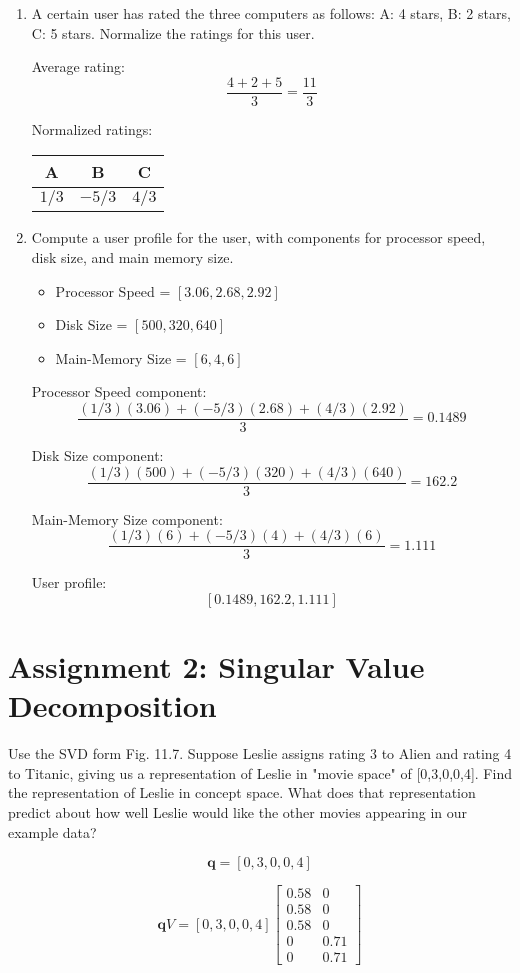 \documentclass{article}
\begin{document}
\begin{enumerate}
\item{A certain user has rated the three computers as follows: A: 4 stars, B: 2 stars, C: 5 stars. Normalize the ratings for this user.

Average rating: $$\frac{4+2+5}{3} = \frac{11}{3}$$

Normalized ratings:
	\begin{center}
	\begin{tabular}{ c | c | c }
		A    & B     & C    \\ \hline
		$1/3$ & $-5/3$ & $4/3$
	\end{tabular}
\end{center}
}
\item{Compute a user profile for the user, with components for processor speed, disk size, and main memory size.
	
	\begin{itemize}
		\item Processor Speed = $[3.06, 2.68, 2.92]$
		\item Disk Size = $[500, 320, 640]$
		\item Main-Memory Size = $[6, 4, 6]$
	\end{itemize}

	Processor Speed component:
	$$\frac{(1/3)(3.06)+(-5/3)(2.68)+(4/3)(2.92)}{3} = 0.1489$$

	Disk Size component:
	$$\frac{(1/3)(500)+(-5/3)(320)+(4/3)(640)}{3} = 162.2$$
	
	Main-Memory Size component:
	$$\frac{(1/3)(6)+(-5/3)(4)+(4/3)(6)}{3} = 1.111$$

	User profile:
	$$[0.1489, 162.2, 1.111]$$

}
\end{enumerate}

\section{Assignment 2: Singular Value Decomposition}
Use the SVD form Fig. 11.7. Suppose Leslie assigns rating 3 to Alien and rating 4 to Titanic, giving us a representation of Leslie in "movie space" of [0,3,0,0,4]. Find the representation of Leslie in concept space. What does that representation predict about how well Leslie would like the other movies appearing in our example data?

\[
\mathbf{q} = [0,3,0,0,4]
\]

\[
\mathbf{q}V = [0,3,0,0,4]
\begin{bmatrix}
	0.58 & 0 \\
	0.58 & 0 \\
	0.58 & 0 \\
	0 & 0.71 \\
	0 & 0.71
\end{bmatrix}
\]
\end{document}
